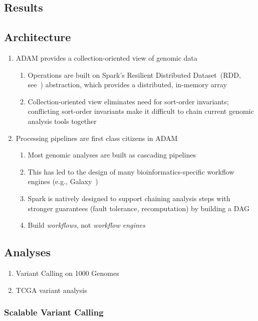 \documentclass{nature}
\begin{document}
\begin{refsegment}
\section{Results}
\label{sec:results}

\subsection{Architecture}
\label{sec:architecture}

\begin{enumerate}
\item ADAM provides a collection-oriented view of genomic data
\begin{enumerate}
\item Operations are built on Spark's Resilient Distributed Dataset~(RDD, see~\cite{zaharia12})
abstraction, which provides a distributed, in-memory array
\item Collection-oriented view eliminates need for sort-order invariants; conflicting sort-order
invariants make it difficult to chain current genomic analysis tools together
\end{enumerate}
\item Processing pipelines are first class citizens in ADAM
\begin{enumerate}
\item Most genomic analyses are built as cascading pipelines
\item This has led to the design of many bioinformatics-specific workflow engines (e.g.,
Galaxy~\cite{goecks10})
\item Spark is natively designed to support chaining analysis steps with stronger
guarantees (fault tolerance, recomputation) by building a DAG~\cite{zaharia10}
\item Build \emph{workflows}, not \emph{workflow engines}
\end{enumerate}
\end{enumerate}

\subsection{Analyses}
\label{sec:analyses}

\begin{enumerate}
\item Variant Calling on 1000 Genomes
\item TCGA variant analysis
\end{enumerate}

\subsubsection{Scalable Variant Calling}
\label{sec:scalable-variant-calling}


\end{refsegment}
\end{document}
